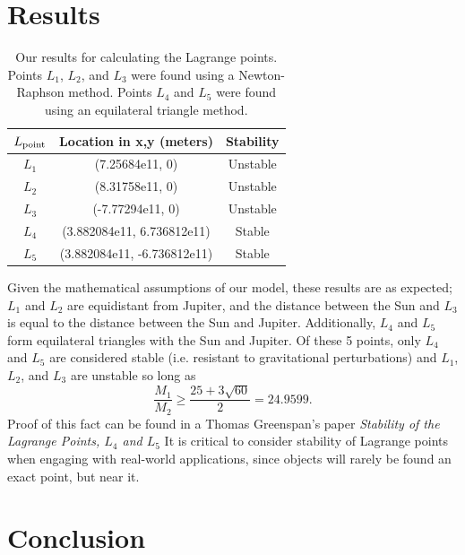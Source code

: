 \documentclass[linenumbers,RNAAS,trackchanges]{aastex631}
\begin{document}
\section{\textbf{Results}}
\begin{table}[H]
    \centering
    \begin{tabular}{|c|c|c|}
         \hline
         $L_{\textup{point}}$ &  Location in x,y (meters) & Stability \\
         \hline
         $L_1$ & (7.25684e11, 0) & Unstable \\
         \hline
         $L_2$ & (8.31758e11, 0) & Unstable \\
         \hline
         $L_3$ & (-7.77294e11, 0) & Unstable \\
         \hline
         $L_4$ & (3.882084e11, 6.736812e11) & Stable \\
         \hline
         $L_5$ & (3.882084e11, -6.736812e11) & Stable \\
         \hline
    \end{tabular}
    \caption{Our results for calculating the Lagrange points. Points $L_1$, $L_2$, and $L_3$ were found using a Newton-Raphson method. Points $L_4$ and $L_5$ were found using an equilateral triangle method.}
    \label{tab:data_tab}
\end{table}
Given the mathematical assumptions of our model, these results are as expected; $L_1$ and $L_2$ are equidistant from Jupiter, and the distance between the Sun and $L_3$ is equal to the distance between the Sun and Jupiter. Additionally, $L_4$ and $L_5$ form equilateral triangles with the Sun and Jupiter. Of these 5 points, only $L_4$ and $L_5$ are considered stable (i.e. resistant to gravitational perturbations) and $L_1$, $L_2$, and $L_3$ are unstable so long as 
\[\frac{M_1}{M_2} \geq \frac{25 + 3\sqrt{60}}{2} =24.9599. \] Proof of this fact can be found in a Thomas Greenspan's paper \textit{Stability of the Lagrange Points, $L_4$ and $L_5$}\cite[6-8]{Greenspan_2014} It is critical to consider stability of Lagrange points when engaging with real-world applications, since objects will rarely be found an exact point, but near it.

\section{\textbf{Conclusion}} \label{sec:summary}
\end{document}
